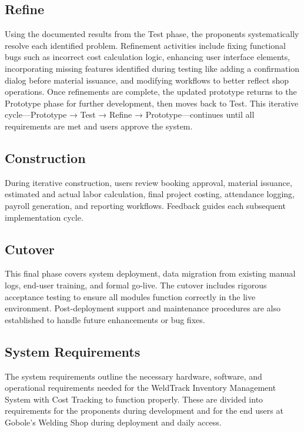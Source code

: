 \documentclass[12pt, letterpaper]{article}
\begin{document}
 \subsection*{Refine}
\hspace*{2em} Using the documented results from the Test phase, the proponents systematically resolve each identified problem. Refinement activities include fixing functional bugs such as incorrect cost calculation logic, enhancing user interface elements, incorporating missing features identified during testing like adding a confirmation dialog before material issuance, and modifying workflows to better reflect shop operations. Once refinements are complete, the updated prototype returns to the Prototype phase for further development, then moves back to Test. This iterative cycle—Prototype → Test → Refine → Prototype—continues until all requirements are met and users approve the system.

 \subsection*{Construction}
\hspace*{2em} During iterative construction, users review booking approval, material issuance, estimated and actual labor calculation, final project costing, attendance logging, payroll generation, and reporting workflows. Feedback guides each subsequent implementation cycle.

 \subsection*{Cutover}
 \hspace*{2em} This final phase covers system deployment, data migration from existing manual logs, end-user training, and formal go-live. The cutover includes rigorous acceptance testing to ensure all modules function correctly in the live environment. Post-deployment support and maintenance procedures are also established to handle future enhancements or bug fixes.

\subsection{System Requirements}
\hspace*{2em} The system requirements outline the necessary hardware, software, and operational requirements needed for the WeldTrack Inventory Management System with Cost Tracking to function properly. These are divided into requirements for the proponents during development and for the end users at Gobole's Welding Shop during deployment and daily access.
\end{document}
